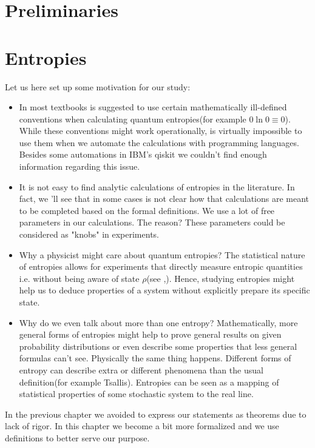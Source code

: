\documentclass[a4paper,12pt]{book}
\begin{document}

\pagestyle{plain}

\tableofcontents
\chapter{Preliminaries}


\chapter{Entropies}
\noindent
Let us here set up some motivation for our study:
\begin{itemize}
\item In most textbooks is suggested to use certain mathematically ill-defined conventions when calculating quantum entropies(for example $0\ln 0\equiv 0$). While these conventions might work operationally, is virtually impossible to use them when we automate the calculations with programming languages. Besides some automations in IBM's qiskit we couldn't find enough information regarding this issue.
\item It is not easy to find analytic calculations of entropies in the literature. In fact, we 'll see that in some cases is not clear how that calculations are meant to be completed based on the formal definitions. We use a lot of free parameters in our calculations. The reason? These parameters could be considered as "knobs" in experiments.
\item Why a physicist might care about quantum entropies? The statistical nature of entropies allows for experiments that directly  measure entropic quantities i.e. without being aware of state $\rho$(see \cite{islam2015measuring},\cite{de2020proposal}). Hence, studying entropies might help us to deduce properties of a system without explicitly prepare its specific state.
\item Why do we even talk about more than one entropy? Mathematically, more general forms of entropies might help to prove general results on given probability distributions or even describe some properties that less general formulas can't see. Physically the same thing happens. Different forms of entropy can  describe extra or different phenomena than the usual definition(for example Tsallis). Entropies can be seen as a mapping of statistical properties of some stochastic system to the real line.
\end{itemize}
\par
In the previous chapter we avoided to express our statements as theorems due to lack of rigor. In this chapter we become a bit more formalized and we use definitions to better serve our purpose.






\end{document}
